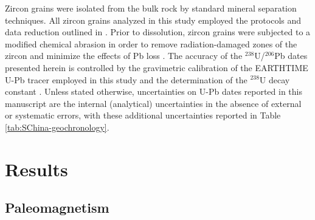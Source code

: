 Zircon grains were isolated from the bulk rock by standard mineral separation techniques. All zircon grains analyzed in this study employed the protocols and data reduction outlined in \citet{Meyers2012a}. Prior to dissolution, zircon grains were subjected to a modified chemical abrasion in order to remove radiation-damaged zones of the zircon and minimize the effects of Pb loss \citep{Mattinson2005a}. The accuracy of the $^{238}$U/$^{206}$Pb dates presented herein is controlled by the gravimetric calibration of the EARTHTIME U-Pb tracer employed in this study and the determination of the $^{238}$U decay constant \citep{Jaffey1971a, Condon2015a}. Unless stated otherwise, uncertainties on U-Pb dates reported in this manuscript are the internal (analytical) uncertainties in the absence of external or systematic errors, with these additional uncertainties reported in Table \ref{tab:SChina-geochronology}.

\section{Results}

\subsection{Paleomagnetism}

